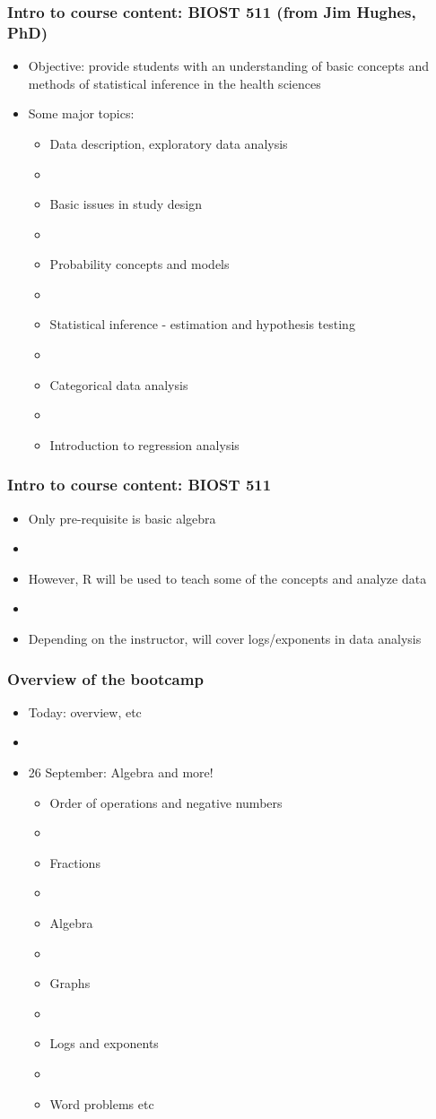 \documentclass[12pt]{beamer}
\newcommand{\myframe}[1]{\begin{frame} \frametitle{#1}}
\begin{document}
\myframe{Intro to course content: BIOST 511 (from Jim Hughes, PhD)}
\begin{itemize}
\item Objective: provide students with an understanding of basic concepts and methods of statistical inference in the health sciences
\item Some major topics:
\begin{itemize}
\item Data description, exploratory data analysis
\item[]
\item Basic issues in study design
\item[]
\item Probability concepts and models
\item[]
\item Statistical inference - estimation and hypothesis testing
\item[]
\item Categorical data analysis
\item[]
\item Introduction to regression analysis
\end{itemize}
\end{itemize}
\end{frame}

\myframe{Intro to course content: BIOST 511}
\begin{itemize}
\item Only pre-requisite is basic algebra
\item[]
\item However, R will be used to teach some of the concepts and analyze data
\item[]
\item Depending on the instructor, will cover logs/exponents in data analysis
\end{itemize}
\end{frame}

\myframe{Overview of the bootcamp}
\begin{itemize}
\item Today: overview, etc
\item[]
\item 26 September: Algebra and more!
\begin{itemize}
\item Order of operations and negative numbers
\item[]
\item Fractions
\item[]
\item Algebra
\item[]
\item Graphs
\item[]
\item Logs and exponents
\item[]
\item Word problems etc
\end{itemize}
\end{itemize}
\end{frame}
\end{document}
